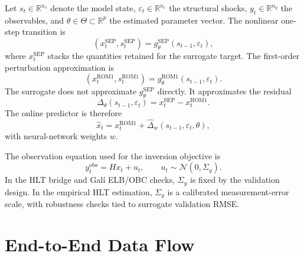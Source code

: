 \documentclass[12pt]{article}
\newcommand{\R}{\mathbb{R}}
\newcommand{\N}{\mathcal{N}}
\newcommand{\eps}{\varepsilon}
\newcommand{\Sigmay}{\Sigma_y}
\newcommand{\rom}{\mathrm{ROM1}}
\newcommand{\sep}{\mathrm{SEP}}
\newcommand{\obs}{\mathrm{obs}}
\begin{document}
Let \(s_t\in\R^{n_s}\) denote the model state, \(\eps_t\in\R^{n_\eps}\) the
structural shocks, \(y_t\in\R^{n_y}\) the observables, and
\(\theta\in\Theta\subset\R^p\) the estimated parameter vector. The nonlinear
one-step transition is
\[
  (x_t^{\sep},s_t^{\sep})
  =
  g^{\sep}_\theta(s_{t-1},\eps_t),
\]
where \(x_t^{\sep}\) stacks the quantities retained for the surrogate target.
The first-order perturbation approximation is
\[
  (x_t^{\rom},s_t^{\rom})
  =
  g^{\rom}_\theta(s_{t-1},\eps_t).
\]
The surrogate does not approximate \(g^{\sep}_\theta\) directly. It approximates
the residual
\begin{equation}
  \Delta_\theta(s_{t-1},\eps_t)
  =
  x_t^{\sep}-x_t^{\rom}.
\label{eq:tech_residual_target}
\end{equation}
The online predictor is therefore
\begin{equation}
  \widehat{x}_t
  =
  x_t^{\rom}
  +
  \widehat{\Delta}_w(s_{t-1},\eps_t,\theta),
\label{eq:tech_surrogate_predictor}
\end{equation}
with neural-network weights \(w\).

The observation equation used for the inversion objective is
\begin{equation}
  y_t^{\obs}=H x_t + u_t,\qquad u_t\sim\N(0,\Sigmay).
\label{eq:tech_obs_eq}
\end{equation}
In the HLT bridge and Gal\'i ELB/OBC checks, \(\Sigmay\) is fixed by the
validation design. In the empirical HLT estimation, \(\Sigmay\) is a calibrated
measurement-error scale, with robustness checks tied to surrogate validation
RMSE.

\section{End-to-End Data Flow}
\label{apptech:dataflow}
\end{document}
